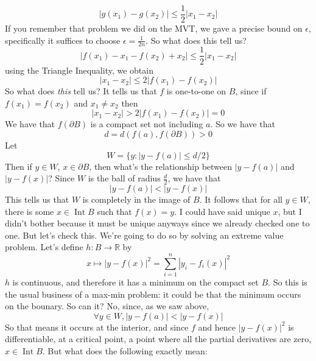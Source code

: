 \documentclass{article}
\DeclareMathOperator{\Int}{Int}
\newcommand{\reals}[0]{\mathbb{R}}
\begin{document}
\begin{equation}|g(x_1) - g(x_2)| \leq \frac{1}{2}|x_1 - x_2|\end{equation}
If you remember that problem we did on the MVT, we gave a precise bound on \(\epsilon\), specifically it suffices to choose \(\epsilon = \frac{1}{2n}\). So what does this tell us?
\begin{equation}|f(x_1) - x_1 - f(x_2) + x_2| \leq \frac{1}{2}|x_1 - x_2|\end{equation}
using the Triangle Inequality, we obtain
\begin{equation}|x_1 - x_2| \leq 2|f(x_1) - f(x_2)|\end{equation}
So what does \textit{this} tell us? It tells us that \(f\) is one-to-one on \(B\), since if \(f(x_1) = f(x_2)\) and \(x_1 \neq x_2\) then
\begin{equation}|x_1 - x_2| > 2|f(x_1) - f(x_2)| = 0\end{equation}
We have that \(f(\partial B)\) is a compact set not including \(a\). So we have that
\begin{equation}d = d(f(a), f(\partial B)) > 0\end{equation}
Let
\begin{equation}W = \{y : |y - f(a)| \leq d/2\}\end{equation}
Then if \(y \in W\), \(x \in \partial B\), then what's the relationship between
\(|y - f(a)|\) and \(|y - f(x)|\)? Since \(W\) is the ball of radius \(\frac{d}{2}\), we have that
\begin{equation}|y - f(a)| < |y - f(x)|\end{equation}
This tells us that \(W\) is completely in the image of \(B\). It follows that for all \(y \in W\), there is some \(x \in \Int B\) such that \(f(x) = y\). I could have said unique \(x\), but I didn't bother because it must be unique anyways since we already checked one to one. But let's check this. We're going to do so by solving an extreme value problem. Let's define \(h: B \to \reals\) by
\begin{equation}x \mapsto |y - f(x)|^2 = \sum_{i = 1}^n|y_i - f_i(x)|^2\end{equation}
\(h\) is continuous, and therefore it has a minimum on the compact set \(B\). So this is the usual business of a max-min problem: it could be that the minimum occurs on the bounary. So can it? No, since, as we saw above,
\begin{equation}\forall y \in W, |y - f(a)| < |y - f(x)|\end{equation}
So that means it occurs at the interior, and since \(f\) and hence \(|y - f(x)|^2\) is differentiable, at a critical point, a point where all the partial derivatives are zero, \(x \in \Int B\). But what does the following exactly mean:
\end{document}
